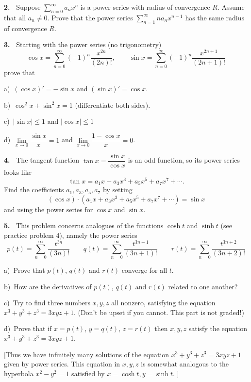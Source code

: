 \documentclass[12pt]{article}
\theoremstyle{definition}
\theoremstyle{remark}
\theoremstyle{definition}
\begin{document}
{\bf 2.\ } Suppose $\sum_{n=0}^\infty a_nx^n$ is a power series with radius of convergence $R$. Assume that all $a_n\neq 0$. Prove that the power series $\sum\limits_{n=1}^\infty na_nx^{n-1}$  has the same radius of convergence $R$.

{\bf 3.\ } Starting with the power series (no trigonometry)
\[\cos x=\sum_{n=0}^\infty (-1)^n\frac{x^{2n}}{(2n)!},\qquad 
\sin x=\sum_{n=0}^\infty (-1)^n\frac{x^{2n+1}}{(2n+1)!}
\]
prove that 

a)\ $(\cos x)'=-\sin x$ and $(\sin x)'=\cos x$.

b)\ $\cos^2x+\sin^2 x=1$ (differentiate both sides). 

c)\ $|\sin x|\leq 1$ and $|\cos x|\leq 1$

d)\ $\lim\limits_{x\to 0}\dfrac{\sin x}{x}=1$ and $\lim\limits_{x\to 0}\dfrac{1-\cos x}{x}=0$. 




{\bf 4.\ } The tangent function $\tan x=\dfrac{\sin x}{\cos x}$ is an odd function, so its power series looks like
\[\tan x=a_1x+a_3x^3+a_5x^5+a_7x^7+\cdots.\]
Find the  coefficients $a_1, a_3, a_5, a_7$ by setting 
\[(\cos x)\cdot(a_1x+a_3x^3+a_5x^5+a_7x^7+\cdots)=\sin x\]
and using the power series for $\cos x$ and $\sin x$. 


{\bf 5.\ } 
This problem concerns analogues of the functions $\cosh t$ and $\sinh t$ (see practice problem 4),
namely the power series 
\[
p(t)= \sum_{n=0}^\infty \frac{t^{3n}}{(3n)!}\qquad
q(t)= \sum_{n=0}^\infty \frac{t^{3n+1}}{(3n+1)!}\qquad
r(t)= \sum_{n=0}^\infty \frac{t^{3n+2}}{(3n+2)!}
\]

a)\ Prove that $p(t)$, $q(t)$ and $r(t)$ converge for all $t$. 

b)\ How are the derivatives of $p(t)$, $q(t)$ and $r(t)$ related to one another? 

c)\ Try  to find  three numbers $x,y,z$ all nonzero, satisfying the equation $x^3+y^3+z^3=3xyz+1$. (Don't be upset if you cannot. This part is not graded!)

d)\ Prove that if  $x=p(t)$, $y=q(t)$, $z=r(t)$ then $x,y,z$ satisfy the equation 
$x^3+y^3+z^3=3xyz+1$. 

[Thus we have infinitely many solutions of the equation $x^3+y^3+z^3=3xyz+1$ given by power series. This equation in $x,y,z$ is somewhat analogous to the hyperbola $x^2-y^2=1$ satisfied by $x=\cosh t, y=\sinh t$. ]
\end{document}
